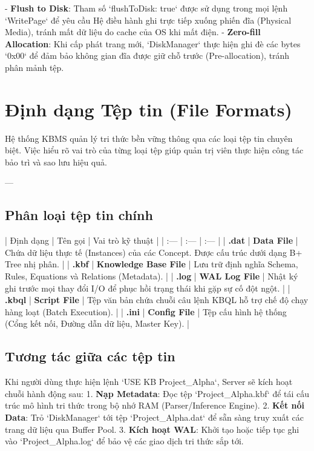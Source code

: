 - \textbf{Flush to Disk}: Tham số `flushToDisk: true` được sử dụng trong mọi lệnh `WritePage` để yêu cầu Hệ điều hành ghi trực tiếp xuống phiến đĩa (Physical Media), tránh mất dữ liệu do cache của OS khi mất điện.
- \textbf{Zero-fill Allocation}: Khi cấp phát trang mới, `DiskManager` thực hiện ghi đè các bytes `0x00` để đảm bảo không gian đĩa được giữ chỗ trước (Pre-allocation), tránh phân mảnh tệp.

\section{Định dạng Tệp tin (File Formats)}

Hệ thống KBMS quản lý tri thức bền vững thông qua các loại tệp tin chuyên biệt. Việc hiểu rõ vai trò của từng loại tệp giúp quản trị viên thực hiện công tác bảo trì và sao lưu hiệu quả.

---

\subsection{Phân loại tệp tin chính}

| Định dạng | Tên gọi | Vai trò kỹ thuật |
| :--- | :--- | :--- |
| \textbf{.dat} | \textbf{Data File} | Chứa dữ liệu thực tế (Instances) của các Concept. Được cấu trúc dưới dạng B+ Tree nhị phân. |
| \textbf{.kbf} | \textbf{Knowledge Base File} | Lưu trữ định nghĩa Schema, Rules, Equations và Relations (Metadata). |
| \textbf{.log} | \textbf{WAL Log File} | Nhật ký ghi trước mọi thay đổi I/O để phục hồi trạng thái khi gặp sự cố đột ngột. |
| \textbf{.kbql} | \textbf{Script File} | Tệp văn bản chứa chuỗi câu lệnh KBQL hỗ trợ chế độ chạy hàng loạt (Batch Execution). |
| \textbf{.ini} | \textbf{Config File} | Tệp cấu hình hệ thống (Cổng kết nối, Đường dẫn dữ liệu, Master Key). |

\subsection{Tương tác giữa các tệp tin}

Khi người dùng thực hiện lệnh `USE KB Project\_Alpha`, Server sẽ kích hoạt chuỗi hành động sau:
1.  \textbf{Nạp Metadata}: Đọc tệp `Project\_Alpha.kbf` để tái cấu trúc mô hình tri thức trong bộ nhớ RAM (Parser/Inference Engine).
2.  \textbf{Kết nối Data}: Trỏ `DiskManager` tới tệp `Project\_Alpha.dat` để sẵn sàng truy xuất các trang dữ liệu qua Buffer Pool.
3.  \textbf{Kích hoạt WAL}: Khởi tạo hoặc tiếp tục ghi vào `Project\_Alpha.log` để bảo vệ các giao dịch tri thức sắp tới.

